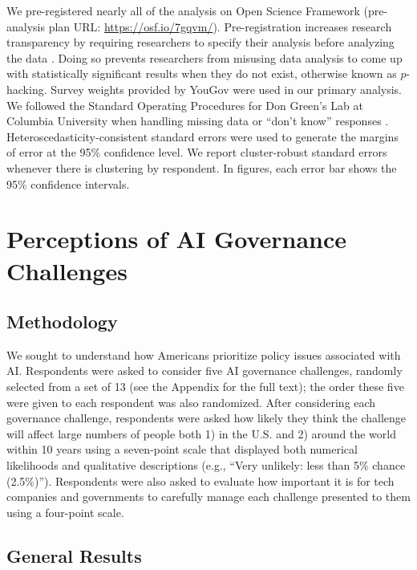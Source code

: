 \documentclass{article}
\begin{document}
We pre-registered nearly all of the analysis on Open Science Framework (pre-analysis plan URL: \url{https://osf.io/7gqvm/}). Pre-registration increases research transparency by requiring researchers to specify their analysis before analyzing the data \citep{nosek2018preregistration}. Doing so prevents researchers from misusing data analysis to come up with statistically significant results when they do not exist, otherwise known as $p$-hacking. Survey weights provided by YouGov were used in our primary analysis. We followed the Standard Operating Procedures for Don Green's Lab at Columbia University when handling missing data or ``don't know'' responses \citep{lin2016standard}. Heteroscedasticity-consistent standard errors were used to generate the margins of error at the 95\% confidence level. We report cluster-robust standard errors whenever there is clustering by respondent. In figures, each error bar shows the 95\% confidence intervals. 

\section{Perceptions of AI Governance Challenges}

\subsection{Methodology}

We sought to understand how Americans prioritize policy issues associated with AI. Respondents were asked to consider five AI governance challenges, randomly selected from a set of 13 (see the Appendix for the full text); the order these five were given to each respondent was also randomized. After considering each governance challenge, respondents were asked how likely they think the challenge will affect large numbers of people both 1) in the U.S. and 2) around the world within 10 years using a seven-point scale that displayed both numerical likelihoods and qualitative descriptions (e.g., ``Very unlikely: less than 5\% chance (2.5\%)''). Respondents were also asked to evaluate how important it is for tech companies and governments to carefully manage each challenge presented to them using a four-point scale.

\subsection{General Results}
\end{document}
